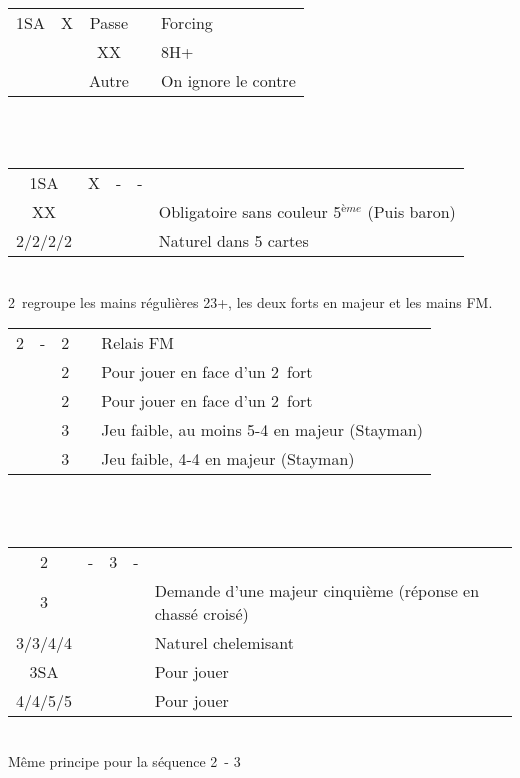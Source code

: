 \documentclass[a4paper, oneside, 11pt]{report}
\begin{document}
		\begin{tabular}{cccc|l}
		1SA & X & Passe && Forcing\\
		&& XX && 8H+\\
                  && Autre && On ignore le contre\\
		\end{tabular}\\\\

		\begin{tabular}{cccc|l}
		1SA & X & - & - & \\
                  XX &&&& Obligatoire sans couleur 5$^{ème}$ (Puis baron)\\
		2\trefle/2\carreau/2\coeur/2\pique &&&& Naturel dans 5 cartes\\
		\end{tabular}\\

	2\trefle\ regroupe les mains régulières 23+, les deux forts en majeur et les mains FM.\\
	
	\begin{tabular}{cccc|l}
	2\trefle & - & 2\carreau && Relais FM\\
	&& 2\coeur && Pour jouer en face d'un 2\coeur\ fort\\
	&& 2\pique && Pour jouer en face d'un 2\pique\ fort\\
	&& 3\trefle && Jeu faible, au moins 5-4 en majeur (Stayman)\\
	&& 3\carreau && Jeu faible, 4-4 en majeur (Stayman)\\
	\end{tabular}\\\\
	
	\begin{tabular}{cccc|l}
	2\trefle & - & 3\trefle & - &\\
	3\carreau &&&& Demande d'une majeur cinquième (réponse en chassé croisé)\\
	3\coeur/3\pique/4\trefle/4\carreau &&&& Naturel chelemisant\\
	3SA &&&& Pour jouer\\
	4\coeur/4\pique/5\trefle/5\carreau &&&& Pour jouer\\	
	\end{tabular}\\
	Même principe pour la séquence 2\trefle\ - 3\carreau\\
\end{document}

